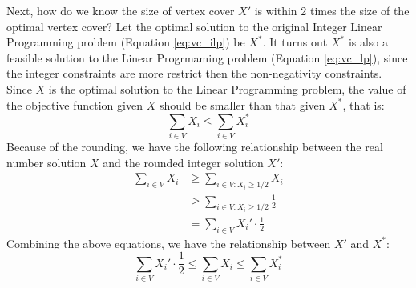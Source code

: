 \documentclass{article}
\begin{document}
Next, how do we know the size of vertex cover $X'$ is within 2 times the size
of the optimal vertex cover?
Let the optimal solution to the original Integer Linear Programming
problem (Equation \ref{eq:vc_ilp}) be $X^{*}$.
It turns out $X^{*}$ is also a feasible solution to the Linear Progrmaming
problem (Equation \ref{eq:vc_lp}), since the integer constraints are
more restrict then the non-negativity constraints. Since $X$ is the optimal
solution to the Linear Programming problem, the value of the objective function
given $X$ should be smaller than that given $X^{*}$, that is:
\begin{equation}
\sum_{i \in V} X_{i} \le \sum_{i \in V} X_{i}^{*}
\end{equation}
Because of the rounding, we have the following relationship between the 
real number solution $X$ and the rounded integer solution $X'$:
\begin{equation}
	\begin{split}
		\sum_{i \in V} X_{i} 
		&\ge \sum_{i \in V:X_i \ge 1/2} X_i\\
		&\ge \sum_{i \in V:X_i \ge 1/2} \frac{1}{2}\\
		&= \sum_{i \in V} X_i'\cdot \frac{1}{2}
	\end{split}
\end{equation}
Combining the above equations, we have the relationship between $X'$ and $X^{*}$:
\begin{equation}
\sum_{i \in V} X_i'\cdot \frac{1}{2} 
\le \sum_{i \in V} X_{i} \le \sum_{i \in V} X_{i}^{*}
\end{equation}
\end{document}
